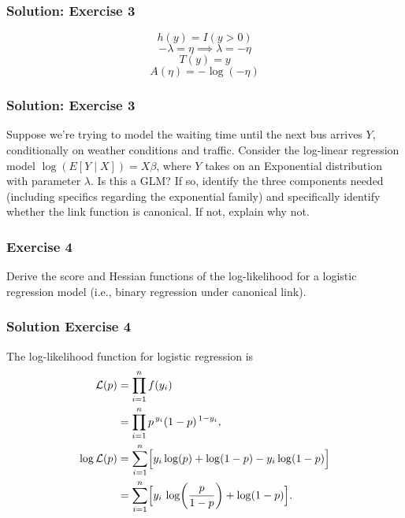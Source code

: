\documentclass{beamer}
\begin{document}
\begin{frame}
\frametitle{Solution: Exercise 3}



$$h(y) = I(y > 0)$$
$$ - \lambda = \eta \implies \lambda = -\eta $$
$$T(y) = y $$
$$A(\eta) = - \log(-\eta) $$

\end{frame}

\begin{frame}
\frametitle{Solution: Exercise 3}

Suppose we’re trying to model the waiting time until the next bus arrives $Y$, conditionally on weather conditions and traffic. Consider the log-linear regression model $\log (E[Y \mid X]) = X\beta$, where $Y$ takes on an Exponential distribution with parameter $\lambda$. Is this a GLM? If so, identify the three components needed (including specifics regarding the exponential family) and specifically identify whether the link function is canonical. If not, explain why not.



\end{frame}

\begin{frame}
\frametitle{Exercise 4}

Derive the score and Hessian functions of the log-likelihood for a logistic regression model (i.e., binary regression under canonical link).

\end{frame}

\begin{frame}
\frametitle{Solution Exercise 4}

The log-likelihood function for logistic regression is
\[
\begin{aligned}
\mathcal{L}(p) &= \prod_{i=1}^n f(y_i) \\
&= \prod_{i=1}^n p^{\,y_i}(1-p)^{\,1-y_i}, \\
\log\mathcal{L}(p) &= \sum_{i=1}^n \Bigl[ y_i\log(p) + \log(1-p) - y_i\log(1-p) \Bigr] \\
&= \sum_{i=1}^n \Bigl[ y_i\,\log\!\left(\frac{p}{1-p}\right) + \log(1-p) \Bigr].
\end{aligned}
\]

\end{frame}
\end{document}

